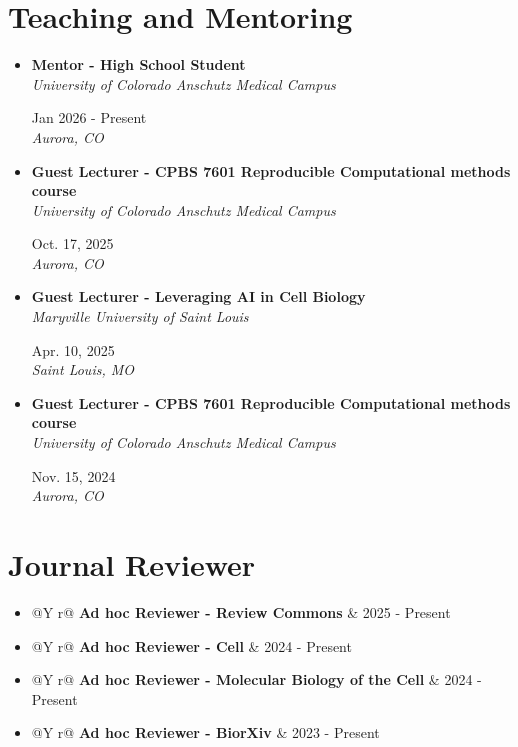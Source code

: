 \documentclass[10.5pt,letterpaper]{article}
\makeatletter
\newcommand{\subheadingskip}{3pt}
\newcommand{\rightcolwidth}{1.3in}
\newcommand{\resumeSubheading}[4]{%
  \vspace{\subheadingskip}\item[]
  \begingroup\rightskip0pt\parfillskip0pt
  \noindent\begin{minipage}[t]{\dimexpr\textwidth-\rightcolwidth-6pt\relax}
    \raggedright\textbf{#1}\\
    \textit{\small\color{muted}#3}
  \end{minipage}%
  \hfill
  \begin{minipage}[t]{\rightcolwidth}
    \raggedleft\textcolor{accent}{\small #2}\\
    \textit{\small\color{muted}#4}
  \end{minipage}
  \par\endgroup
}
\newcommand{\resumeReviewerItem}[2]{%
  \item[]
  \begin{tabularx}{\textwidth}{@{}Y r@{}}
    \textbf{#1} & \textcolor{accent}{\small #2} \\
  \end{tabularx}
}
\makeatother
\begin{document}
\vspace{-16pt}
\section{Teaching and Mentoring}
  {\renewcommand{\subheadingskip}{2pt}
  \begin{itemize}[leftmargin=0pt,label={},itemsep=0pt,topsep=2pt,parsep=0pt]
    \resumeSubheading
      {Mentor - High School Student}{Jan 2026 - Present}
      {University of Colorado Anschutz Medical Campus}{Aurora, CO}
    \resumeSubheading
      {Guest Lecturer - CPBS 7601 Reproducible Computational methods course}{Oct. 17, 2025}
      {University of Colorado Anschutz Medical Campus}{Aurora, CO}
    \resumeSubheading
      {Guest Lecturer - Leveraging AI in Cell Biology}{Apr. 10, 2025}
      {Maryville University of Saint Louis}{Saint Louis, MO}
    \resumeSubheading
      {Guest Lecturer - CPBS 7601 Reproducible Computational methods course}{Nov. 15, 2024}
      {University of Colorado Anschutz Medical Campus}{Aurora, CO}
  \end{itemize}}

\vspace{-16pt}
\section{Journal Reviewer}
  \begin{itemize}[leftmargin=0pt,label={},itemsep=0pt,topsep=2pt,parsep=0pt]
    \resumeReviewerItem{Ad hoc Reviewer - Review Commons}{2025 - Present}
    \resumeReviewerItem{Ad hoc Reviewer - Cell}{2024 - Present}
    \resumeReviewerItem{Ad hoc Reviewer - Molecular Biology of the Cell}{2024 - Present}
    \resumeReviewerItem{Ad hoc Reviewer - BiorXiv}{2023 - Present}
  \end{itemize}

\vspace{-16pt}
\end{document}
